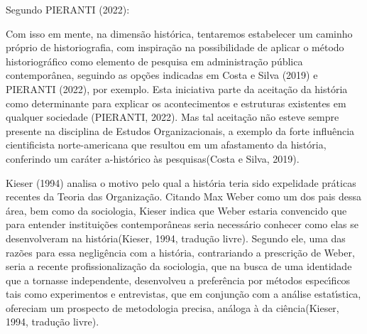 \documentclass[
12pt,		%
openright,	%
twoside,  %
a4paper,			%
chapter=TITLE,		%
english,			%
french,				%
spanish,			%
brazil				%
]{USPSC-classe/USPSC}
\begin{document}
Segundo PIERANTI (2022):










\noindent\begin{center}\mbox{\centering{}}\end{center}


Com isso em mente, na dimens\~ao hist\'orica, tentaremos estabelecer um caminho pr\'oprio de historiografia, com inspira\c{c}\~ao na possibilidade de aplicar o m\'etodo historiogr\'afico como elemento de pesquisa em administra\c{c}\~ao p\'ublica contempor\^anea, seguindo as op\c{c}\~oes indicadas em   Costa e Silva (2019) e PIERANTI (2022), por exemplo. Esta iniciativa parte da aceita\c{c}\~ao da hist\'oria como determinante para explicar os acontecimentos e estruturas existentes em qualquer sociedade (PIERANTI, 2022). Mas tal aceita\c{c}\~ao n\~ao esteve sempre presente na disciplina de Estudos Organizacionais, a exemplo da \textquotedbl forte influ\^encia cientificista norte-americana que resultou em um afastamento da hist\'oria, conferindo um car\'ater a-hist\'orico \`as pesquisas\textquotedbl   (Costa e Silva, 2019).









 Kieser (1994)  analisa o motivo pelo qual a hist\'oria teria sido \textquotedbl expelida\textquotedbl  de pr\'aticas recentes da Teoria das Organiza\c{c}\~ao. Citando Max Weber como um dos pais dessa \'area, bem como da sociologia, Kieser indica que Weber estaria \textquotedbl convencido que para entender institui\c{c}\~oes contempor\^aneas seria necess\'ario conhecer como elas se desenvolveram na hist\'oria\textquotedbl   (Kieser, 1994, tradu\c{c}\~ao livre). Segundo ele, uma das raz\~oes para essa neglig\^encia com a hist\'oria, contrariando a prescri\c{c}\~ao de Weber, seria a recente profissionaliza\c{c}\~ao da sociologia, que na busca de uma identidade que a tornasse independente, desenvolveu a prefer\^encia por m\'etodos espec\'{\i}ficos tais como experimentos e entrevistas, que \textquotedbl em conjun\c{c}\~ao com a an\'alise estat\'{\i}stica, ofereciam um prospecto de metodologia precisa, an\'aloga \`a da ci\^encia\textquotedbl   (Kieser, 1994, tradu\c{c}\~ao livre).
\end{document}
